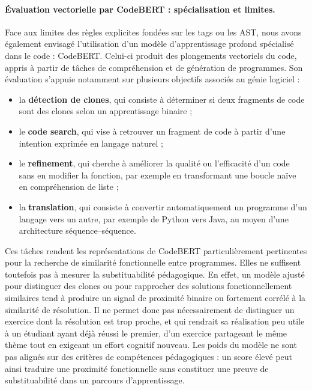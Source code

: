 \documentclass[12pt,a4paper,oneside]{report}
\begin{document}
\paragraph{Évaluation vectorielle par CodeBERT : spécialisation et limites.}

Face aux limites des règles explicites fondées sur les tags ou les AST, nous
avons également envisagé l'utilisation d'un modèle d'apprentissage profond
spécialisé dans le code : CodeBERT. Celui-ci produit des plongements
vectoriels du code, appris à partir de tâches de compréhension et de
génération de programmes. Son évaluation s'appuie notamment sur plusieurs
objectifs associés au génie logiciel :

\begin{itemize}
    \item la \textbf{détection de clones}, qui consiste à déterminer si deux
    fragments de code sont des clones selon un apprentissage binaire ;
    \item le \textbf{code search}, qui vise à retrouver un fragment de code
    à partir d'une intention exprimée en langage naturel ;
    \item le \textbf{refinement}, qui cherche à améliorer la qualité ou
    l'efficacité d'un code sans en modifier la fonction, par exemple en
    transformant une boucle naïve en compréhension de liste ;
    \item la \textbf{translation}, qui consiste à convertir
    automatiquement un programme d'un langage vers un autre, par exemple de
    Python vers Java, au moyen d'une architecture séquence--séquence.
\end{itemize}

Ces tâches rendent les représentations de CodeBERT particulièrement
pertinentes pour la recherche de similarité fonctionnelle entre programmes.
Elles ne suffisent toutefois pas à mesurer la substituabilité pédagogique.
En effet, un modèle ajusté pour distinguer des clones ou pour rapprocher des
solutions fonctionnellement similaires tend à produire un signal de
proximité binaire ou fortement corrélé à la similarité de résolution. Il ne
permet donc pas nécessairement de distinguer un exercice dont la résolution
est trop proche, et qui rendrait sa réalisation peu utile à un étudiant ayant
déjà réussi le premier, d'un exercice partageant le même thème tout en
exigeant un effort cognitif nouveau. Les poids du modèle ne sont pas alignés
sur des critères de compétences pédagogiques : un score élevé peut ainsi
traduire une proximité fonctionnelle sans constituer une preuve de
substituabilité dans un parcours d'apprentissage.
\end{document}
